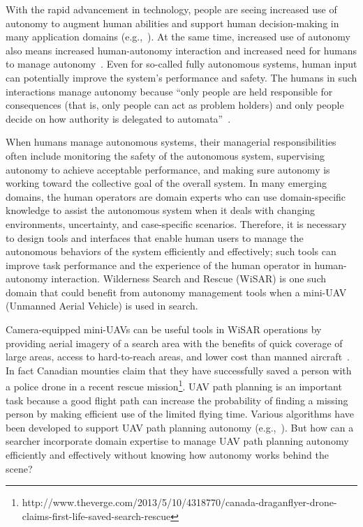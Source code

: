 With the rapid advancement in technology, people are seeing increased use of autonomy to augment human abilities and support human decision-making in many application domains (e.g.,~\cite{Chun2010Limousine,Casper2003Human,Lin2010Supporting,Robins2009From}). At the same time, increased use of autonomy also means increased human-autonomy interaction and increased need for humans to manage autonomy~\cite{Bainbridge1983Ironies}. Even for so-called fully autonomous systems, human input can potentially improve the system's performance and safety. The humans in such interactions manage autonomy because ``only people are held responsible for consequences (that is, only people can act as problem holders) and only people decide on how authority is delegated to automata''~\cite{Woods2006Joint,Bradshaw2013Seven}.

When humans manage autonomous systems, their managerial responsibilities often include monitoring the safety of the autonomous system, supervising autonomy to achieve acceptable performance, and making sure autonomy is working toward the collective goal of the overall system. In many emerging domains, the human operators are domain experts who can use domain-specific knowledge to assist the autonomous system when it deals with changing environments, uncertainty, and case-specific scenarios. Therefore, it is necessary to design tools and interfaces that enable human users to manage the autonomous behaviors of the system efficiently and effectively; such tools can improve task performance and the experience of the human operator in human-autonomy interaction. Wilderness Search and Rescue (WiSAR) is one such domain that could benefit from autonomy management tools when a mini-UAV (Unmanned Aerial Vehicle) is used in search.

Camera-equipped mini-UAVs can be useful tools in WiSAR operations by providing aerial imagery of a search area with the benefits of quick coverage of large areas, access to hard-to-reach areas, and lower cost than manned aircraft~\cite{Murphy2008Cooperative, Goodrich2008Supporting}. In fact Canadian mounties claim that they have successfully saved a person with a police drone in a recent rescue mission\footnote{http://www.theverge.com/2013/5/10/4318770/canada-draganflyer-drone-claims-first-life-saved-search-rescue}. UAV path planning is an important task because a good flight path can increase the probability of finding a missing person by making efficient use of the limited flying time. Various algorithms have been developed to support UAV path planning autonomy (e.g.,~\cite{Bourgault2003Coordinated, Lin2009UAV, Lin2014Hierarchical}). But how can a searcher incorporate domain expertise to manage UAV path planning autonomy efficiently and effectively without knowing how autonomy works behind the scene?
 
